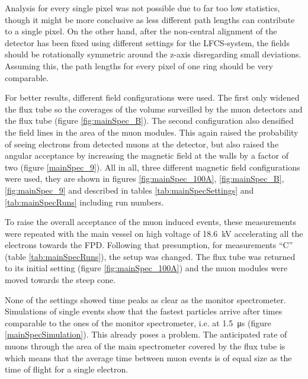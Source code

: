   Analysis for every single pixel was not possible due to far too low statistics, though it might be more conclusive as less different path lengths can contribute to a single pixel. On the other hand, after the non-central alignment of the detector has been fixed using different settings for the LFCS-system, the fields should be rotationally symmetric around the z-axis disregarding small deviations. Assuming this, the path lengths for every pixel of one ring should be very comparable.
  
  
  For better results, different field configurations were used. The first only widened the flux tube so the coverages of the volume surveilled by the muon detectors and the flux tube (figure \ref{fig:mainSpec_B}). The second configuration also densified the field lines in the area of the muon modules. This again raised the probability of seeing electrons from detected muons at the detector, but also raised the angular acceptance by increasing the magnetic field at the walls by a factor of two (figure \ref{mainSpec_9}).
  All in all, three different magnetic field configurations were used, they are shown in figures \ref{fig:mainSpec_100A}, \ref{fig:mainSpec_B}, \ref{fig:mainSpec_9} and described in tables \ref{tab:mainSpecSettings} and \ref{tab:mainSpecRuns} including run numbers.  
  
	
  To raise the overall acceptance of the muon induced events, these measurements were repeated with the main vessel on high voltage of \SI{18.6}{\kilo\volt} accelerating all the electrons towards the FPD.
  Following that presumption, for measurements ``C'' (table \ref{tab:mainSpecRuns}), the setup was changed. The flux tube was returned to its initial setting (figure \ref{fig:mainSpec_100A}) and the muon modules were moved towards the steep cone.
  
  None of the settings showed time peaks as clear as the monitor spectrometer. 
  Simulations of single events show that the fastest particles arrive after times comparable to the ones of the monitor spectrometer, i.e. at \SI{1.5}{\micro\second} (figure \ref{mainSpecSimulation}). This already poses a problem. The anticipated rate of muons through the area of the main spectrometer covered by the flux tube is
  \begin{equation}
  	
  \end{equation}
  which means that the average time between muon events is of equal size as the time of flight for a single electron. 
  
